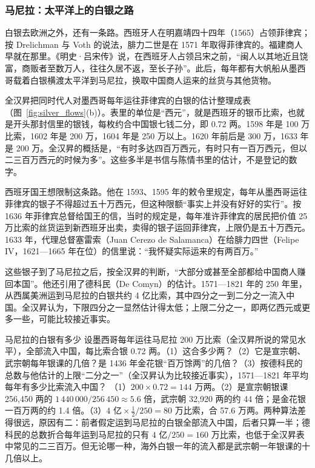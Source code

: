 \subsubsection{马尼拉：太平洋上的白银之路}
白银去欧洲之外，还有一条路。西班牙人在明嘉靖四十四年（1565）占领菲律宾\cite{quan1969}；按 Drelichman 与 Voth 的说法，腓力二世是在 1571 年取得菲律宾的\cite{dv2010}。福建商人早就在那里。《明史·吕宋传》说，在西班牙人占领吕宋之前，“闽人以其地近且饶富，商贩者至数万人，往往久居不返，至长子孙”\cite{mingshi}。此后，每年都有大帆船从墨西哥载着白银横渡太平洋到马尼拉，换取中国商人运来的丝货与其他货物。

全汉昇把同时代人对墨西哥每年运往菲律宾的白银的估计整理成表（图~\ref{fig:silver_flows}(b)）。表里的单位是“西元”，就是西班牙的银币比索，也就是开头那封信里的银钱，每枚约合中国银七钱二分，即 0.72 两\cite{quan1969}。1598 年是 100 万比索，1602 年是 200 万，1604 年是 250 万以上。1620 年前后是 300 万，1633 年是 200 万。全汉昇的概括是，“有时多达四百万西元，有时只有一百万西元，但以二三百万西元的时候为多”\cite{quan1969}。这些多半是书信与陈情书里的估计，不是登记的数字。

西班牙国王想限制这条路。他在 1593、1595 年的敕令里规定，每年从墨西哥运往菲律宾的银子不得超过五十万西元，但这种限额“事实上并没有好好的实行”\cite{quan1969}。按 1636 年菲律宾总督给国王的信，当时的规定是，每年准许菲律宾的居民把价值 25 万比索的丝货运到新西班牙出卖，卖得的银子运回菲律宾，上限仍是五十万西元\cite{quan1969}。1633 年，代理总督塞雷索（Juan Cerezo de Salamanca）在给腓力四世（Felipe IV，1621—1665 年在位）的信里说：“我怀疑实际运来的有两百万。”\cite{br}

这些银子到了马尼拉之后，按全汉昇的判断，“大部分或甚至全部都给中国商人赚回本国”\cite{quan1969}。他还引用了德科民（De Comyn）的估计。1571—1821 年的 250 年里，从西属美洲运到马尼拉的白银共约 4 亿比索，其中四分之一到二分之一流入中国。全汉昇认为，下限四分之一显然估计得太低；上限二分之一，即两亿西元或更多一些，可能比较接近事实\cite{quan1969}。

\begin{example}{马尼拉的白银有多少}\label{ex:silver-scale}
设墨西哥每年运往马尼拉 200 万比索（全汉昇所说的常见水平），全部流入中国，每比索合银 0.72 两。（1）这合多少两？（2）它是宣宗朝、武宗朝每年银课的几倍？是 1436 年金花银“百万馀两”的几倍？（3）按德科民的总数与他估计的上限“二分之一”（全汉昇认为比较接近事实），1571—1821 年平均每年有多少比索流入中国？
\solution （1）$200\times0.72=144$ 万两。（2）是宣宗朝银课 256,450 两的 $1\,440\,000/256\,450\approx5.6$ 倍，武宗朝 32,920 两的约 44 倍；是金花银一百万两的约 1.4 倍。（3）$4\text{ 亿}\times\frac12/250=80$ 万比索，合 57.6 万两。两种算法差得很远，原因有二：前者假定运到马尼拉的白银全部流入中国，后者只算一半；德科民的总数折合每年运到马尼拉的只有 $4\text{ 亿}/250=160$ 万比索，也低于全汉昇表中常见的二三百万。但无论哪一种，海外白银一年的流入都是武宗朝一年银课的十几倍以上。
\end{example}

